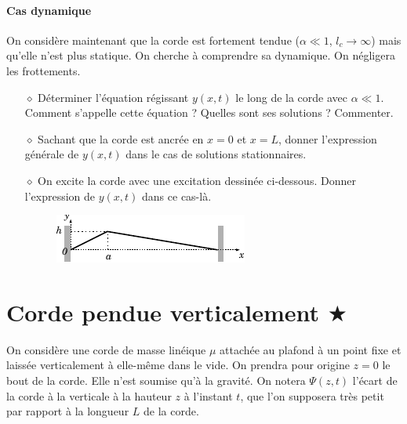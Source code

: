 \documentclass{report}
\begin{document}
\paragraph{Cas dynamique} On considère maintenant que la corde est fortement tendue ($\alpha\ll1$, $l_c\longrightarrow\infty$) mais qu'elle n'est plus statique. On cherche à comprendre sa dynamique. On négligera les frottements.

\begin{itemize}

	\item[$\diamond$] Déterminer l'équation régissant $y(x,t)$ le long de la corde avec $\alpha\ll1$. Comment s'appelle cette équation ? Quelles sont ses solutions ? Commenter.
	
	\item[$\diamond$] Sachant que la corde est ancrée en $x=0$ et $x=L$, donner l'expression générale de $y(x,t)$ dans le cas de solutions stationnaires. 
	
	\item[$\diamond$] On excite la corde avec une excitation dessinée ci-dessous. Donner l'expression de $y(x,t)$ dans ce cas-là.
	
	\begin{figure}[h!]
	\centering
		\includegraphics[scale=1.5]{onde2.pdf}
	\end{figure}

	
\end{itemize}

\newpage

\section*{Corde pendue verticalement $\bigstar$}

On considère une corde de masse linéique $\mu$ attachée au plafond à un point fixe et laissée verticalement à elle-même dans le vide. On prendra pour origine $z=0$ le bout de la corde. Elle n'est soumise qu'à la gravité. On notera $\Psi(z,t)$ l'écart de la corde à la verticale à la hauteur $z$ à l'instant $t$, que l'on supposera très petit par rapport à la longueur $L$ de la corde.
\end{document}
